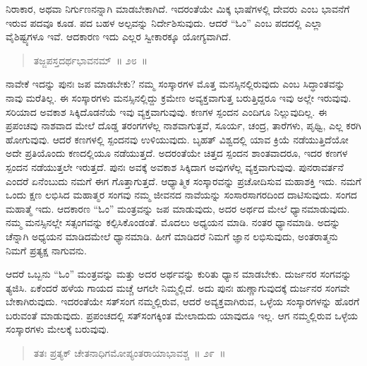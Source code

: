 ನಿರಾಕಾರ, ಅಥವಾ ನಿರ್ಗುಣನನ್ನಾಗಿ ಮಾಡಬೇಕಾಗಿದೆ. ಇದರಂತೆಯೇ ಮಿಕ್ಕ ಭಾಷೆಗಳಲ್ಲಿ ದೇವರು ಎಂಬ ಭಾವನೆಗೆ ಇರುವ ಪದವೂ ಕೂಡ. ಪದ ಬಹಳ ಅಲ್ಪವನ್ನು ನಿರ್ದೇಶಿಸುವುದು. ಆದರೆ “ಓಂ” ಎಂಬ ಪದದಲ್ಲಿ ಎಲ್ಲಾ ವೈಶಿಷ್ಟ್ಯಗಳೂ ಇವೆ. ಆದಕಾರಣ ಇದು ಎಲ್ಲರ ಸ್ವೀಕಾರಕ್ಕೂ ಯೋಗ್ಯವಾಗಿದೆ.

\eject

\begin{verse}
ತಜ್ಜಪಸ್ತದರ್ಥಭಾವನಮ್​~॥ ೨೮~॥
\end{verse}

\vspace{-0.3cm}


ನಾವೇಕೆ ಇದನ್ನು ಪುನಃ ಜಪ ಮಾಡಬೇಕು? ನಮ್ಮ ಸಂಸ್ಕಾರಗಳ ಮೊತ್ತ ಮನಸ್ಸಿನಲ್ಲಿರುವುದು ಎಂಬ ಸಿದ್ಧಾಂತವನ್ನು ನಾವು ಮರೆತಿಲ್ಲ. ಈ ಸಂಸ್ಕಾರಗಳು ಮನಸ್ಸಿನಲ್ಲಿದ್ದು ಕ್ರಮೇಣ ಅವ್ಯಕ್ತವಾಗುತ್ತ ಬರುತ್ತಿದ್ದರೂ ಇವು ಅಲ್ಲೇ ಇರುವುವು. ಸರಿಯಾದ ಅವಕಾಶ ಸಿಕ್ಕಿದೊಡನೆಯೆ ಇವು ವ್ಯಕ್ತವಾಗುವುವು. ಕಣಗಳ ಸ್ಪಂದನ ಎಂದಿಗೂ ನಿಲ್ಲುವುದಿಲ್ಲ. ಈ ಪ್ರಪಂಚವು ನಾಶವಾದ ಮೇಲೆ ದೊಡ್ಡ ತರಂಗಗಳೆಲ್ಲ ನಾಶವಾಗುತ್ತವೆ, ಸೂರ್ಯ, ಚಂದ್ರ, ತಾರೆಗಳು, ಪೃಥ್ವಿ, ಎಲ್ಲ ಕರಗಿ ಹೋಗುವುವು. ಆದರೆ ಕಣಗಳಲ್ಲಿ ಸ್ಪಂದನವು ಉಳಿಯುವುದು. ಬೃಹತ್​ ವಿಶ್ವದಲ್ಲಿ ಯಾವ ಕ್ರಿಯೆ ನಡೆಯುತ್ತಿದೆಯೋ ಅದೇ ಪ್ರತಿಯೊಂದು ಕಣದಲ್ಲಿಯೂ ನಡೆಯುತ್ತದೆ. ಅದರಂತೆಯೇ ಚಿತ್ತದ ಸ್ಪಂದನ ಶಾಂತವಾದರೂ, ಇದರ ಕಣಗಳ ಸ್ಪಂದನ ನಡೆಯುತ್ತಲೇ ಇರುತ್ತದೆ. ಪುನಃ ಅವಕ್ಕೆ ಅವಕಾಶ ಸಿಕ್ಕಿದಾಗ ಅವುಗಳೆಲ್ಲ ವ್ಯಕ್ತವಾಗುವುವು. ಪುನರಾವರ್ತನೆ ಎಂದರೆ ಏನೆಂಬುದು ನಮಗೆ ಈಗ ಗೊತ್ತಾಗುತ್ತದೆ. ಆಧ್ಯಾತ್ಮಿಕ ಸಂಸ್ಕಾರವನ್ನು ಪ್ರಚೋದಿಸುವ ಮಹಾಶಕ್ತಿ ಇದು. ನಮಗೆ ಒಂದು ಕ್ಷಣ ಲಭಿಸಿದ ಮಹಾತ್ಮರ ಸಂಗವು ನಮ್ಮ ಜೀವನದ ನಾವೆಯನ್ನು ಸಂಸಾರಸಾಗರದಿಂದ ದಾಟಿಸುವುದು. ಸಂಗದ ಮಹಾತ್ಮೆ ಇದು. ಆದಕಾರಣ “ಓಂ” ಮಂತ್ರವನ್ನು ಜಪ ಮಾಡುವುದು, ಅದರ ಅರ್ಥದ ಮೇಲೆ ಧ್ಯಾನಮಾಡುವುದು. ನಮ್ಮ ಮನಸ್ಸಿನಲ್ಲೇ ಸತ್ಸಂಗವನ್ನು ಕಲ್ಪಿಸಿಕೊಂಡಂತೆ. ಮೊದಲು ಅಧ್ಯಯನ ಮಾಡಿ. ನಂತರ ಧ್ಯಾನಮಾಡಿ. ಅದನ್ನು ಚೆನ್ನಾಗಿ ಅಧ್ಯಯನ ಮಾಡಿದಮೇಲೆ ಧ್ಯಾನಮಾಡಿ. ಹೀಗೆ ಮಾಡಿದರೆ ನಿಮಗೆ ಜ್ಞಾನ ಲಭಿಸುವುದು, ಅಂತರಾತ್ಮನು ನಿಮಗೆ ಪ್ರತ್ಯಕ್ಷ ನಾಗುವನು. 

ಆದರೆ ಒಬ್ಬನು “ಓಂ” ಮಂತ್ರವನ್ನು ಮತ್ತು ಅದರ ಅರ್ಥವನ್ನು ಕುರಿತು ಧ್ಯಾನ ಮಾಡಬೇಕು. ದುರ್ಜನರ ಸಂಗವನ್ನು ತ್ಯಜಿಸಿ. ಏಕೆಂದರೆ ಹಳೆಯ ಗಾಯದ ಮಚ್ಚೆ ಆಗಲೇ ನಿಮ್ಮಲ್ಲಿದೆ. ಅದು ಪುನಃ ಹುಣ್ಣಾಗುವುದಕ್ಕೆ ದುರ್ಜನರ ಸಂಗವೇ ಬೇಕಾಗಿರುವುದು. ಇದರಂತೆಯೇ ಸತ್​ಸಂಗ ನಮ್ಮಲ್ಲಿರುವ, ಆದರೆ ಅವ್ಯಕ್ತವಾಗಿರುವ, ಒಳ್ಳೆಯ ಸಂಸ್ಕಾರಗಳನ್ನು ಹೊರಗೆ ಬರುವಂತೆ ಮಾಡುವುದು. ಪ್ರಪಂಚದಲ್ಲಿ ಸತ್​ಸಂಗಕ್ಕಿಂತ ಮೇಲಾದುದು ಯಾವುದೂ ಇಲ್ಲ. ಆಗ ನಮ್ಮಲ್ಲಿರುವ ಒಳ್ಳೆಯ ಸಂಸ್ಕಾರಗಳು ಮೇಲಕ್ಕೆ ಬರುವುವು. 


\begin{verse}
ತತಃ ಪ್ರತ್ಯಕ್​ ಚೇತನಾಧಿಗಮೋಪ್ಯಂತರಾಯಾಭಾವಶ್ಚ~॥ ೨೯~॥
\end{verse}


